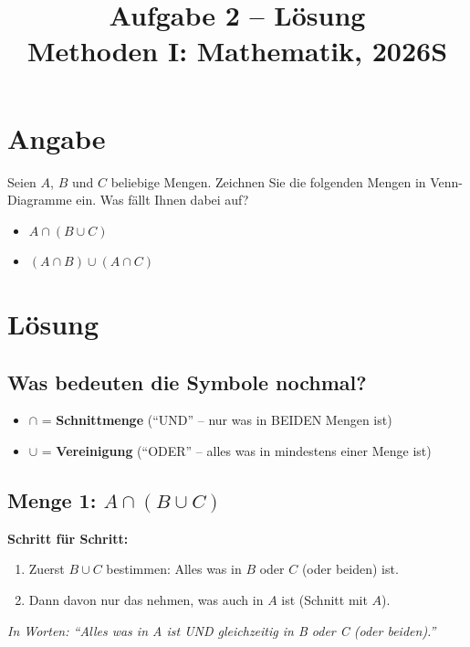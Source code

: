 \documentclass[12pt, a4paper]{article}
\title{\textbf{Aufgabe 2 -- Lösung} \\ Methoden I: Mathematik, 2026S}
\author{}
\date{}
\begin{document}
\maketitle

\section*{Angabe}
Seien $A$, $B$ und $C$ beliebige Mengen. Zeichnen Sie die folgenden Mengen in Venn-Diagramme ein. Was fällt Ihnen dabei auf?

\begin{itemize}
    \item $A \cap (B \cup C)$
    \item $(A \cap B) \cup (A \cap C)$
\end{itemize}

\section*{Lösung}

\subsection*{Was bedeuten die Symbole nochmal?}
\begin{itemize}
    \item $\cap$ = \textbf{Schnittmenge} ("`UND"' -- nur was in BEIDEN Mengen ist)
    \item $\cup$ = \textbf{Vereinigung} ("`ODER"' -- alles was in mindestens einer Menge ist)
\end{itemize}

\subsection*{Menge 1: $A \cap (B \cup C)$}

\textbf{Schritt für Schritt:}
\begin{enumerate}
    \item Zuerst $B \cup C$ bestimmen: Alles was in $B$ oder $C$ (oder beiden) ist.
    \item Dann davon nur das nehmen, was auch in $A$ ist (Schnitt mit $A$).
\end{enumerate}

\textit{In Worten: "`Alles was in A ist UND gleichzeitig in B oder C (oder beiden)."'}
\end{document}
